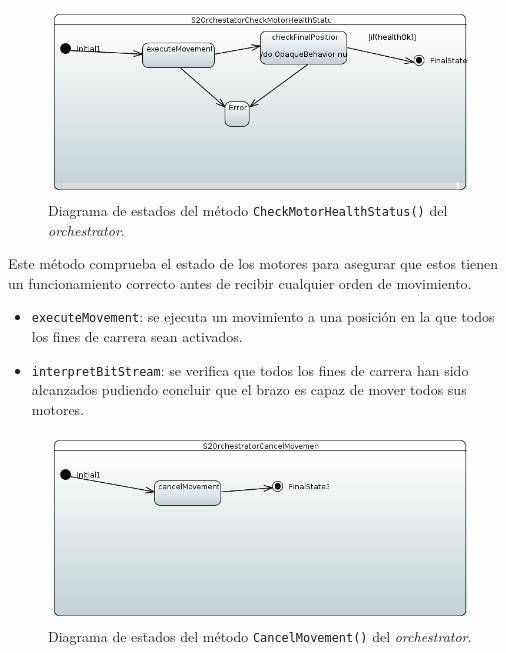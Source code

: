 \begin{figure}[H]
    \centering
    \includegraphics[width=1\linewidth]{pictures/S2OrchestratorCheckMotorHealthStatus.PNG}
    \caption{Diagrama de estados del método \texttt{CheckMotorHealthStatus()} del \textit{orchestrator}.}
    \label{fig:fun_check_motor_health_status_orchestrator}
\end{figure}

Este método comprueba el estado de los motores para asegurar que estos tienen un funcionamiento correcto antes de recibir cualquier orden de movimiento.

\begin{itemize}
    \item \texttt{executeMovement}: se ejecuta un movimiento a una posición en la que todos los fines de carrera sean activados.
    \item \texttt{interpretBitStream}: se verifica que todos los fines de carrera han sido alcanzados pudiendo concluir que el brazo es capaz de mover todos sus motores.
    
\end{itemize}

\begin{figure}[H]
    \centering
    \includegraphics[width=1\linewidth]{pictures/S2OrchestratorCancelMovement.PNG}
    \caption{Diagrama de estados del método \texttt{CancelMovement()} del \textit{orchestrator}.}
    \label{fig:fun_cancel_movement_orchestrator}
\end{figure}

